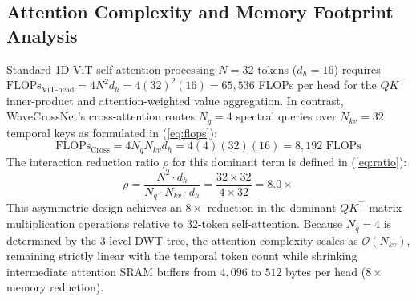 \documentclass[conference]{IEEEtran}
\begin{document}
\subsection{Attention Complexity and Memory Footprint Analysis}
Standard 1D-ViT self-attention processing $N=32$ tokens ($d_h=16$) requires $\mathrm{FLOPs}_{\text{ViT-head}} = 4 N^2 d_h = 4(32)^2(16) = 65{,}536$ FLOPs per head for the $QK^\top$ inner-product and attention-weighted value aggregation. In contrast, WaveCrossNet's cross-attention routes $N_q = 4$ spectral queries over $N_{kv} = 32$ temporal keys as formulated in (\ref{eq:flops}):
\begin{equation}
\mathrm{FLOPs}_{\text{Cross}} = 4 N_q N_{kv} d_h = 4(4)(32)(16) = 8{,}192 \text{ FLOPs}
\label{eq:flops}
\end{equation}
The interaction reduction ratio $\rho$ for this dominant term is defined in (\ref{eq:ratio}):
\begin{equation}
\rho = \frac{N^2 \cdot d_h}{N_q \cdot N_{kv} \cdot d_h} = \frac{32 \times 32}{4 \times 32} = 8.0\times
\label{eq:ratio}
\end{equation}
This asymmetric design achieves an $8\times$ reduction in the dominant $QK^\top$ matrix multiplication operations relative to 32-token self-attention. Because $N_q=4$ is determined by the 3-level DWT tree, the attention complexity scales as $\mathcal{O}(N_{kv})$, remaining strictly linear with the temporal token count while shrinking intermediate attention SRAM buffers from $4{,}096$ to $512$ bytes per head ($8\times$ memory reduction).
\end{document}
